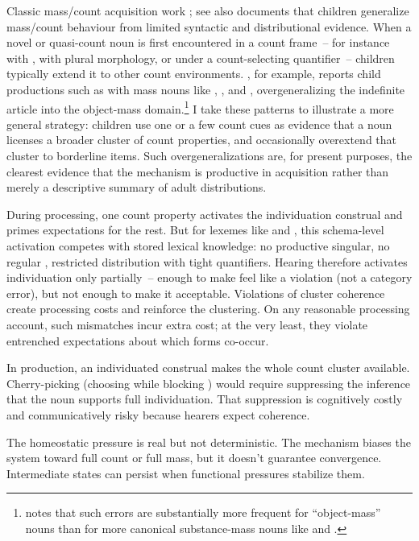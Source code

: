 \documentclass[12pt,a4paper]{article}
\begin{document}
Classic mass/count acquisition work \citep{gordon1985,gordon1988,bloom1994}; see also \textcite[\S5.3]{barner2005} documents that children generalize mass/count behaviour from limited syntactic and distributional evidence. When a novel or quasi-count noun is first encountered in a count frame~-- for instance with , with plural morphology, or under a count-selecting quantifier~-- children typically extend it to other count environments. \textcite{bloom1994}, for example, reports child productions such as  with mass nouns like , , and , overgeneralizing the indefinite article into the object-mass domain.\footnote{\textcite[pp.~302--303]{bloom1994} notes that such errors are substantially more frequent for ``object-mass'' nouns than for more canonical substance-mass nouns like  and .} I take these patterns to illustrate a more general strategy: children use one or a few count cues as evidence that a noun licenses a broader cluster of count properties, and occasionally overextend that cluster to borderline items. Such overgeneralizations are, for present purposes, the clearest evidence that the mechanism is productive in acquisition rather than merely a descriptive summary of adult distributions.

During processing, one count property activates the individuation construal and primes expectations for the rest. But for lexemes like  and , this schema-level activation competes with stored lexical knowledge: no productive singular, no regular , restricted distribution with tight quantifiers. Hearing  therefore activates individuation only partially~-- enough to make  feel like a violation (not a category error), but not enough to make it acceptable. Violations of cluster coherence create processing costs and reinforce the clustering.
On any reasonable processing account, such mismatches incur extra cost; at the very least, they violate entrenched expectations about which forms co-occur.

In production, an individuated construal makes the whole count cluster available. Cherry-picking (choosing  while blocking ) would require suppressing the inference that the noun supports full individuation. That suppression is cognitively costly and communicatively risky because hearers expect coherence.

The homeostatic pressure is real but not deterministic. The mechanism biases the system toward full count or full mass, but it doesn't guarantee convergence. Intermediate states can persist when functional pressures stabilize them.
\end{document}
